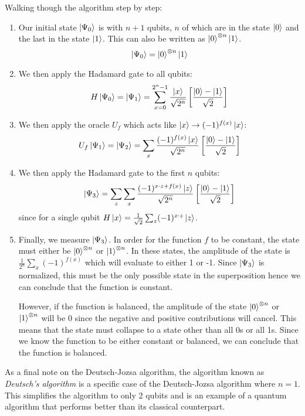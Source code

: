 \documentclass[reqno]{amsart}
\numberwithin{equation}{section}
\numberwithin{figure}{section}
\begin{document}
\begin{justify}
Walking though the algorithm step by step:
    \begin{enumerate}
        \item Our initial state $\ket{\Psi_{0}}$ is with $n+1$ qubits, $n$ of which are in the state $\ket{0}$ and the last in the state $\ket{1}$. This can also be written as $\ket{0}^{\otimes n}\ket{1}$.
            \begin{equation}
                \ket{\Psi_{0}} = \ket{0}^{\otimes n}\ket{1}
            \end{equation}
        \item We then apply the Hadamard gate to all qubits:
            \begin{equation}
                H\ket{\Psi_{0}} = \ket{\Psi_{1}} = \sum\limits_{x=0}^{2^{n}-1}\frac{\ket{x}}{\sqrt{2^{n}}}\left[\frac{\ket{0} - \ket{1}}{\sqrt{2}}\right]
            \end{equation}
        \item We then apply the oracle $U_{f}$ which acts like $\ket{x} \rightarrow (-1)^{f(x)}\ket{x}$:
            \begin{equation}
                U_{f}\ket{\Psi_{1}} = \ket{\Psi_{2}} = \sum\limits_{x}\frac{(-1)^{f(x)}\ket{x}}{\sqrt{2^{n}}}\left[\frac{\ket{0} - \ket{1}}{\sqrt{2}}\right]
            \end{equation}
        \item We then apply the Hadamard gate to the first $n$ qubits:
            \begin{equation}
                \ket{\Psi_{3}} = \sum\limits_{z}\sum\limits_{x}\frac{(-1)^{x \cdot z + f(x)}\ket{z}}{\sqrt{2^{n}}}\left[\frac{\ket{0} - \ket{1}}{\sqrt{2}}\right] \label{eq:finalstate}
            \end{equation}
            since for a single qubit $H\ket{x} = \frac{1}{\sqrt{2}}\sum_{z}(-1)^{x \cdot z}\ket{z}$.
        \item Finally, we measure $\ket{\Psi_{3}}$. In order for the function $f$ to be constant, the state must either be $\ket{0}^{\otimes n}$ or $\ket{1}^{\otimes n}$. In these states, the amplitude of the state is $\frac{1}{2^{n}}\sum_{x}(-1)^{f(x)}$ which will evaluate to either 1 or -1. Since $\ket{\Psi_{3}}$ is normalized, this must be the only possible state in the superposition hence we can conclude that the function is constant.

            However, if the function is balanced, the amplitude of the state $\ket{0}^{\otimes n}$ or $\ket{1}^{\otimes n}$ will be 0 since the negative and positive contributions will cancel. This means that the state must collapse to a state other than all 0s or all 1s. Since we know the function to be either constant or balanced, we can conclude that the function is balanced.
    \end{enumerate}

As a final note on the Deutsch-Jozsa algorithm, the algorithm known as \textit{Deutsch's algorithm} is a specific case of the Deutsch-Jozsa algorithm where $n = 1$. This simplifies the algorithm to only 2 qubits and is an example of a quantum algorithm that performs better than its classical counterpart.
\end{justify}
\end{document}
